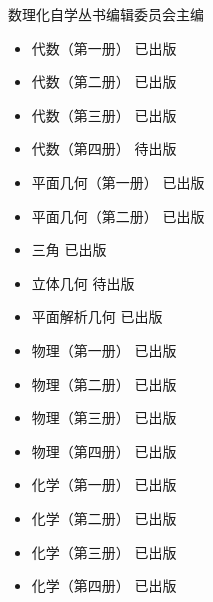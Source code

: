 数理化自学丛书编辑委员会主编

\begin{itemize}
\item
  代数（第一册） 已出版
\item
  代数（第二册） 已出版
\item
  代数（第三册） 已出版
\item
  代数（第四册） 待出版
\item
  平面几何（第一册） 已出版
\item
  平面几何（第二册） 已出版
\item
  三角 已出版
\item
  立体几何 待出版
\item
  平面解析几何 已出版
\item
  物理（第一册） 已出版
\item
  物理（第二册） 已出版
\item
  物理（第三册） 已出版
\item
  物理（第四册） 已出版
\item
  化学（第一册） 已出版
\item
  化学（第二册） 已出版
\item
  化学（第三册） 已出版
\item
  化学（第四册） 已出版
\end{itemize}
